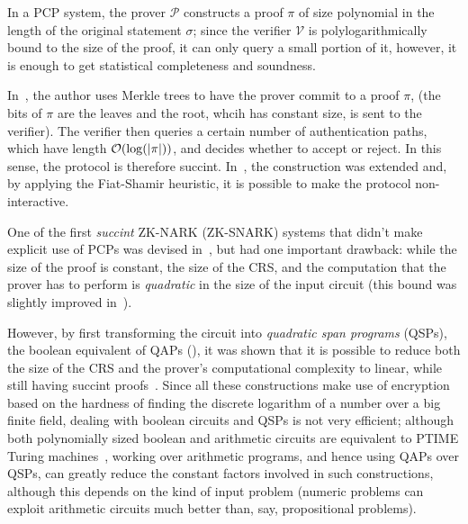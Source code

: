 In a PCP system, the prover \(\mathcal{P}\) constructs a proof \(\pi \) of size polynomial in the 
length of the original statement \(\sigma \); since the verifier \(\mathcal{V}\) is 
polylogarithmically bound to the size of the proof, it can only query a small portion of it, 
however, it is enough to get statistical completeness and soundness.

In~\cite{Kilian1992}, the author uses Merkle trees to have the prover commit to a proof \(\pi \), 
(the bits of \(\pi \) are the leaves and the root, whcih has constant size, is sent to the verifier). 
The verifier then queries a certain number of authentication paths, which have length
\(\BigO{\call{\log}{\abs{\pi}}}\), and decides whether to accept or reject.
In this sense, the protocol is therefore succint.
In~\cite{Micali2000}, the construction was extended and, by applying the Fiat-Shamir heuristic, it 
is possible to make the protocol non-interactive.

One of the first \emph{succint} ZK-NARK (ZK-SNARK) systems that didn't make explicit use of 
PCPs was devised in~\cite{Groth2010}, but had one important drawback: while the size of the proof 
is constant, the size of the CRS, and the computation that the prover has to perform is 
\emph{quadratic} in the size of the input circuit
(this bound was slightly improved in~\cite{Lipmaa2011}).

However, by first transforming the circuit into \emph{quadratic span programs} (QSPs), 
the boolean equivalent of QAPs (), it was shown that it is possible to reduce both 
the size of the CRS and the prover's computational complexity to linear, while still having succint 
proofs~\cite{GennaroGPR2012}.
Since all these constructions make use of encryption based on the hardness of finding the discrete
logarithm of a number over a big finite field, dealing with boolean circuits and QSPs is not 
very efficient; although both polynomially sized boolean and arithmetic circuits are equivalent to 
\textsc{PTIME} Turing machines~\cite{PippengerF1979}, working over arithmetic programs, and hence 
using QAPs over QSPs, can greatly reduce the constant factors involved 
in such constructions, although this depends on the kind of input problem (numeric problems 
can exploit arithmetic circuits much better than, say, propositional problems).

